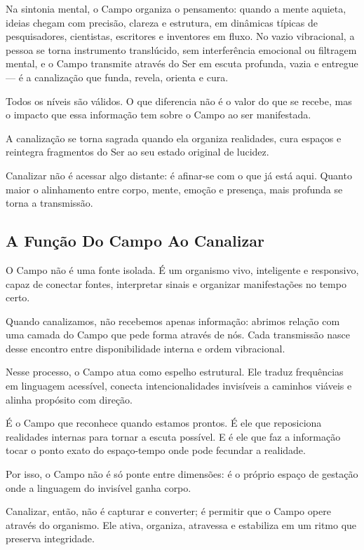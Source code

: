 \documentclass[12pt]{book}
\begin{document}
Na sintonia mental, o Campo organiza o pensamento: quando a mente aquieta, ideias chegam com precisão, clareza e estrutura, em dinâmicas típicas de pesquisadores, cientistas, escritores e inventores em fluxo. No vazio vibracional, a pessoa se torna instrumento translúcido, sem interferência emocional ou filtragem mental, e o Campo transmite através do Ser em escuta profunda, vazia e entregue --- é a canalização que funda, revela, orienta e cura.

Todos os níveis são válidos. O que diferencia não é o valor do que se recebe, mas o impacto que essa informação tem sobre o Campo ao ser manifestada.

A canalização se torna sagrada quando ela organiza realidades, cura espaços e reintegra fragmentos do Ser ao seu estado original de lucidez.

Canalizar não é acessar algo distante: é afinar-se com o que já está aqui. Quanto maior o alinhamento entre corpo, mente, emoção e presença, mais profunda se torna a transmissão.


\subsection*{A Função Do Campo Ao Canalizar}

O Campo não é uma fonte isolada. É um organismo vivo, inteligente e responsivo, capaz de conectar fontes, interpretar sinais e organizar manifestações no tempo certo.

Quando canalizamos, não recebemos apenas informação: abrimos relação com uma camada do Campo que pede forma através de nós. Cada transmissão nasce desse encontro entre disponibilidade interna e ordem vibracional.

Nesse processo, o Campo atua como espelho estrutural. Ele traduz frequências em linguagem acessível, conecta intencionalidades invisíveis a caminhos viáveis e alinha propósito com direção.

É o Campo que reconhece quando estamos prontos. É ele que reposiciona realidades internas para tornar a escuta possível. E é ele que faz a informação tocar o ponto exato do espaço-tempo onde pode fecundar a realidade.

Por isso, o Campo não é só ponte entre dimensões: é o próprio espaço de gestação onde a linguagem do invisível ganha corpo.

Canalizar, então, não é capturar e converter; é permitir que o Campo opere através do organismo. Ele ativa, organiza, atravessa e estabiliza em um ritmo que preserva integridade.
\end{document}
